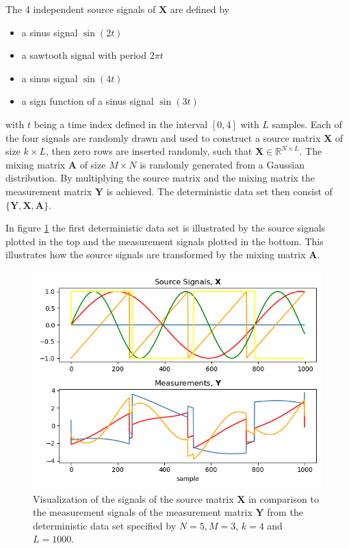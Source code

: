 The 4 independent source signals of $\mathbf{X}$ are defined by 
\begin{itemize}
\item[1.] a sinus signal $\sin(2t)$
\item[2.] a sawtooth signal with period $2 \pi t$
\item[3.] a sinus signal $\sin(4t)$
\item[4.] a sign function of a sinus signal $\sin(3t)$
\end{itemize}
with $t$ being a time index defined in the interval $[0,4]$ with $L$ samples. 
Each of the four signals are randomly drawn and used to construct a source matrix $\mathbf{X}$ of size $k \times L$, then zero rows are inserted randomly, such that $\mathbf{X} \in \mathbb{R}^{N \times L}$. 
The mixing matrix $\mathbf{A}$ of size $M \times N$ is randomly generated from a Gaussian distribution. 
By multiplying the source matrix and the mixing matrix the measurement matrix $\mathbf{Y}$ is achieved.
The deterministic data set then consist of $\{ \mathbf{Y}, \mathbf{X}, \mathbf{A} \}$.

In figure \ref{fig:simple} the first deterministic data set is illustrated by the source signals plotted in the top and the measurement signals plotted in the bottom. 
This illustrates how the source signals are transformed by the mixing matrix $\mathbf{A}$.
\begin{figure}[H]
\centering
\includegraphics[scale=0.5]{figures/ch_6/simple_data.png}
\caption{Visualization of the signals of the source matrix $\mathbf{X}$ in comparison to the measurement signals of the measurement matrix $\mathbf{Y}$ from the deterministic data set specified by $N = 5, M = 3$, $k = 4$ and $L=1000$.}
\label{fig:simple}
\end{figure}
\noindent

